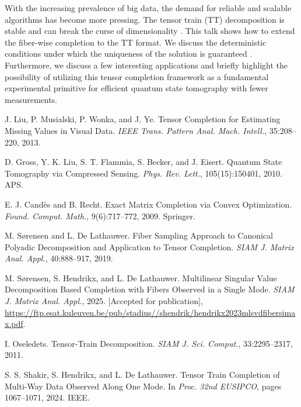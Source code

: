 \documentclass[ILAS2025-program.tex]{subfiles}
\begin{document}
\begin{ilasabstract}
\begin{bibunit}
With the increasing prevalence of big data, the demand for reliable and scalable algorithms has become more pressing. The tensor train (TT) decomposition is stable and can break the curse of dimensionality \cite{oseledets2010tensortrain}. This talk shows how to extend the fiber-wise completion to the TT format. We discuss the deterministic conditions under which the uniqueness of the solution is guaranteed \cite{stijn2023mlsvdfsj, shakir2024ttfw}. Furthermore, we discuss a few interesting applications and briefly highlight the possibility of utilizing this tensor completion framework as a fundamental experimental primitive for efficient quantum state tomography with fewer measurements.

\begin{thebibliography}{7}
 J. Liu, P. Musialski, P. Wonka, and J. Ye. Tensor Completion for Estimating Missing Values in Visual Data. \textit{IEEE Trans. Pattern Anal. Mach. Intell.}, 35:208--220, 2013.

 D. Gross, Y. K. Liu, S. T. Flammia, S. Becker, and J. Eisert. Quantum State Tomography via Compressed Sensing. \textit{Phys. Rev. Lett.}, 105(15):150401, 2010. APS.

 E. J. Cand{\`e}s and B. Recht. Exact Matrix Completion via Convex Optimization. \textit{Found. Comput. Math.}, 9(6):717--772, 2009. Springer.


 M. S{\o}rensen and L. De Lathauwer. Fiber Sampling Approach to Canonical Polyadic Decomposition and Application to Tensor Completion. \textit{SIAM J. Matrix Anal. Appl.}, 40:888--917, 2019.

 M. S{\o}rensen, S. Hendrikx, and L. De Lathauwer. Multilinear Singular Value Decomposition Based Completion with Fibers Observed in a Single Mode. \textit{SIAM J. Matrix Anal. Appl.}, 2025. [Accepted for publication], \url{https://ftp.esat.kuleuven.be/pub/stadius//shendrik/hendrikx2023mlsvdfibersimax.pdf}.

 I. Oseledets. Tensor-Train Decomposition. \textit{SIAM J. Sci. Comput.}, 33:2295--2317, 2011.

 S. S. Shakir, S. Hendrikx, and L. De Lathauwer. Tensor Train Completion of Multi-Way Data Observed Along One Mode. In \textit{Proc. 32nd EUSIPCO}, pages 1067--1071, 2024. IEEE.
\end{thebibliography}
        \end{bibunit}
        \end{ilasabstract}
\end{document}
